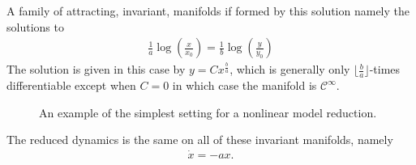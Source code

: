A family of attracting, invariant, manifolds if formed by this solution namely the solutions to
\begin{align}
	\frac{1}{a}\log\left(\frac{x}{x_0}\right) =\frac{1}{b}\log\left(\frac{y}{y_0}\right)
\end{align}
The solution is given in this case by $y = C x^{\frac{b}{a}}$, which is generally only $\lfloor \frac{b}{a} \rfloor$-times differentiable except when $C=0$ in which case the manifold is $\mathcal{C}^{\infty }$.
\begin{figure}[h!]
	\centering
	\caption{An example of the simplest setting for a nonlinear model reduction.}
	\label{fig:simplestReduction}
\end{figure}

The reduced dynamics is the same on all of these invariant manifolds, namely
\begin{align}
	\dot{x} = -ax.
\end{align}


